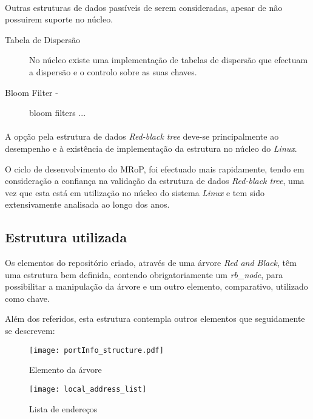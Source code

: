 \paragraph*{}
Outras estruturas de dados passíveis de serem consideradas, apesar de não possuirem suporte no núcleo.

\begin{description}
\item[Tabela de Dispersão]
No núcleo existe uma implementação de tabelas de dispersão que efectuam a dispersão e o controlo sobre as suas chaves.


\item[Bloom Filter - ]
bloom filters ...

\end{description}
\paragraph*{}
A opção pela estrutura de dados \textit{Red-black tree} deve-se principalmente ao desempenho e à existência de implementação da estrutura no núcleo do \textit{Linux}.

O ciclo de desenvolvimento do MRoP, foi efectuado mais rapidamente, tendo em consideração a confiança na validação da estrutura de dados \textit{Red-black tree}, uma vez que esta está em utilização no núcleo do sistema \textit{Linux} e tem sido extensivamente analisada ao longo dos anos.
 
\subsection{Estrutura utilizada}
\label{sub:repo_structure}

Os elementos do repositório criado, através de uma árvore \textit{Red and Black}, têm uma estrutura bem definida, contendo obrigatoriamente um \textit{rb\_node}, para possibilitar a manipulação da árvore e um outro elemento, comparativo, utilizado como chave.

Além dos referidos, esta estrutura contempla outros elementos que seguidamente se descrevem:

\begin{figure}[ht]
\begin{minipage}[b]{0.5\linewidth}
\centering
\texttt{[image: portInfo\_structure.pdf]}
\caption{Elemento da árvore}
\label{fig:portInfo}
\end{minipage}
\hspace{0.5cm}
\begin{minipage}[b]{0.5\linewidth}
\centering
\texttt{[image: local\_address\_list]}
\caption{Lista de endereços}
\label{fig:local_address_list}
\end{minipage}
\end{figure}

